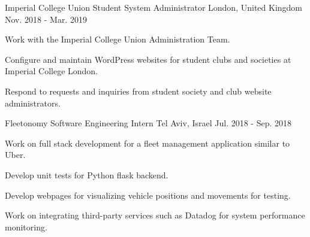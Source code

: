 \begin{cventries}
  \cventry
    {Imperial College Union} %
    {Student System Administrator} %
    {London, United Kingdom} %
    {Nov. 2018 - Mar. 2019} %
    {
      \begin{cvitems} %
        \item {Work with the Imperial College Union Administration Team.}
        \item {Configure and maintain WordPress websites for student clubs and societies at Imperial College London.}
        \item {Respond to requests and inquiries from student society and club website administrators.}
      \end{cvitems}
    }

  \cventry
    {Fleetonomy} %
    {Software Engineering Intern} %
    {Tel Aviv, Israel} %
    {Jul. 2018 - Sep. 2018} %
    {
      \begin{cvitems} %
        \item {Work on full stack development for a fleet management application similar to Uber.}
        \item {Develop unit tests for Python flask backend.}
        \item {Develop webpages for visualizing vehicle positions and movements for testing.}
        \item {Work on integrating third-party services such as Datadog for system performance monitoring.}
      \end{cvitems}
    }
    
\end{cventries}
